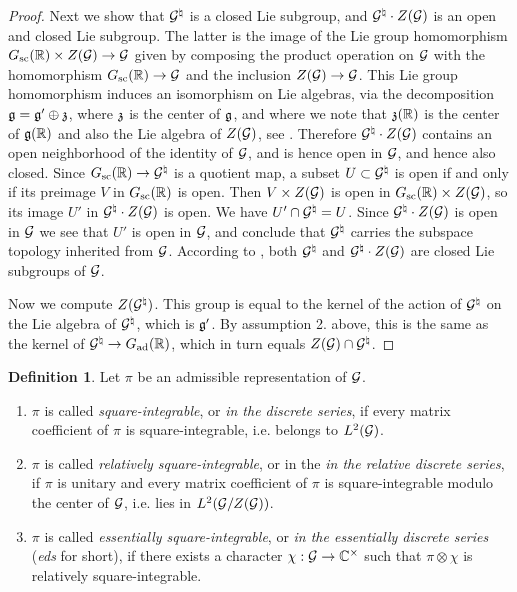 \documentclass{article}
\theoremstyle{definition}
\newtheorem{dfn}[thm]{Definition}
\numberwithin{equation}{section}
\renewcommand{\-}{\hyp{}}
\begin{document}
\begin{proof}
	Next we show that $\mathcal{G}^\natural$ is a closed Lie subgroup, and $\mathcal{G}^\natural \cdot Z(\mathcal{G})$ is an open and closed Lie subgroup. The latter is the image of the Lie group homomorphism $G_{\textrm{sc}}(\mathbb{R}) \times Z(\mathcal{G}) \to \mathcal{G}$ given by composing the product operation on $\mathcal{G}$ with the homomorphism $G_{\textrm{sc}}(\mathbb{R}) \to \mathcal{G}$ and the inclusion $Z(\mathcal{G}) \to \mathcal{G}$. This Lie group homomorphism induces an isomorphism on Lie algebras, via the decomposition $\mathfrak{g}=\mathfrak{g}' \oplus \mathfrak{z}$, where $\mathfrak{z}$ is the center of $\mathfrak{g}$, and where we note that $\mathfrak{z}(\mathbb{R})$ is the center of $\mathfrak{g}(\mathbb{R})$ and also the Lie algebra of $Z(\mathcal{G})$, see \cite[Chapter III, \S9, no. 3, Proposition 9]{BourLie1-3}. Therefore $\mathcal{G}^\natural \cdot Z(\mathcal{G})$ contains an open neighborhood of the identity of $\mathcal{G}$, and is hence open in $\mathcal{G}$, and hence also closed. Since $G_{\textrm{sc}}(\mathbb{R}) \to \mathcal{G}^\natural$ is a quotient map, a subset $U \subset \mathcal{G}^\natural$ is open if and only if its preimage $V$ in $G_{\textrm{sc}}(\mathbb{R})$ is open. Then $V \times Z(\mathcal{G})$ is open in $G_{\textrm{sc}}(\mathbb{R}) \times Z(\mathcal{G})$, so its image $U'$ in $\mathcal{G}^\natural \cdot Z(\mathcal{G})$ is open. We have $U' \cap \mathcal{G}^\natural = U$. Since $\mathcal{G}^\natural \cdot Z(\mathcal{G})$ is open in $\mathcal{G}$ we see that $U'$ is open in $\mathcal{G}$, and conclude that $\mathcal{G}^\natural$ carries the subspace topology inherited from $\mathcal{G}$. According to \cite[Chapter III, \S6, no. 2, Proposition 2]{BourLie1-3}, both $\mathcal{G}^\natural$ and $\mathcal{G}^\natural \cdot Z(\mathcal{G})$ are closed Lie subgroups of $\mathcal{G}$.

	Now we compute $Z(\mathcal{G}^\natural)$. This group is equal to the kernel of the action of $\mathcal{G}^\natural$ on the Lie algebra of $\mathcal{G}^\natural$, which is $\mathfrak{g}'$. By assumption 2. above, this is the same as the kernel of $\mathcal{G}^\natural \to G_{\textrm{ad}}(\mathbb{R})$, which in turn equals $Z(\mathcal{G}) \cap \mathcal{G}^\natural$.
\end{proof}

\begin{dfn} \label{dfn:eds}
	Let $\pi$ be an admissible representation of $\mathcal{G}$.
	\begin{enumerate}
		\item $\pi$ is called \emph{square-integrable}, or \emph{in the discrete series}, if every matrix coefficient of $\pi$ is square-integrable, i.e. belongs to $L^2(\mathcal{G})$.
  		\item $\pi$ is called \emph{relatively square-integrable}, or in the \emph{in the relative discrete series}, if $\pi$ is unitary and 
                  every matrix coefficient of $\pi$ is square-integrable modulo the center of $\mathcal{G}$, i.e. lies in $L^2(\mathcal{G}/Z(\mathcal{G}))$.

  		\item $\pi$ is called  \emph{essentially square-integrable}, or  \emph{in the essentially discrete series} (\emph{eds} for short), if there exists a character $\chi : \mathcal{G} \to \mathbb{C}^\times$ such that $\pi \otimes \chi$ is relatively square-integrable.
	\end{enumerate}
\end{dfn}
\end{document}
